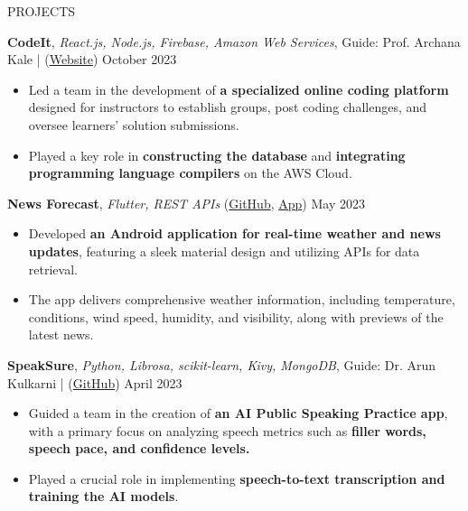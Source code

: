 \documentclass{resume} %
\begin{document}

\begin{rSection}{PROJECTS}
\vspace{-1.25em}
\item \textbf{CodeIt}, \textit{React.js, Node.js, Firebase, Amazon Web Services}, Guide: Prof. Archana Kale | (\href{https://codeit-web.onrender.com/}{Website}) \hfill {October 2023}
\begin{itemize}
    \setlength\itemsep{-0.6em}  
     \item Led a team in the development of \textbf{a specialized online coding platform} designed for instructors to establish groups, post coding challenges, and oversee learners' solution submissions.
     \item Played a key role in \textbf{constructing the database} and \textbf{integrating programming language compilers} on the AWS Cloud.
 \end{itemize}
\item \textbf{News Forecast}, \textit{Flutter, REST APIs} (\href{https://github.com/ninadnaik10/news-forecast}{GitHub}, \href{https://github.com/ninadnaik10/News-Forecast/releases}{App}) \hfill {May 2023}
\begin{itemize}
    \setlength\itemsep{-0.6em}  
     \item Developed \textbf{an Android application for real-time weather and news updates}, featuring a sleek material design and utilizing APIs for data retrieval.
     \item The app delivers comprehensive weather information, including temperature, conditions, wind speed, humidity, and visibility, along with previews of the latest news. 
 \end{itemize}
 \item \textbf{SpeakSure}, \textit{Python, Librosa, scikit-learn, Kivy, MongoDB}, Guide: Dr. Arun Kulkarni | (\href{https://github.com/ninadnaik10/SpeakSure} {GitHub}) \hfill {April 2023}
\begin{itemize}
    \setlength\itemsep{-0.6em}
     \item  Guided a team in the creation of \textbf{an AI Public Speaking Practice app}, with a primary focus on analyzing speech metrics such as \textbf{filler words, speech pace, and confidence levels.}
     \item Played a crucial role in implementing \textbf{speech-to-text transcription and training the AI models}.  

\end{itemize}
\end{rSection}
\end{document}
